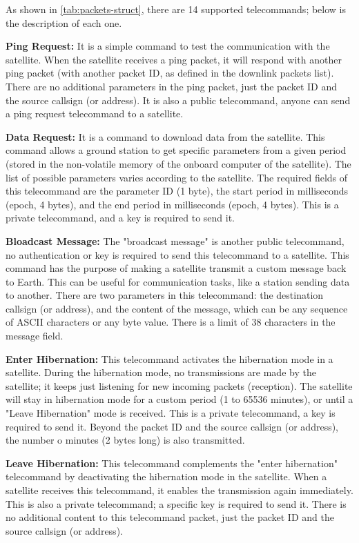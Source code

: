 \par As shown in \autoref{tab:packets-struct}, there are 14 supported telecommands; below is the description of each one.

\textbf{Ping Request:} It is a simple command to test the communication with the satellite. When the satellite receives a ping packet, it will respond with another ping packet (with another packet ID, as defined in the downlink packets list). There are no additional parameters in the ping packet, just the packet ID and the source callsign (or address). It is also a public telecommand, anyone can send a ping request telecommand to a satellite.

\textbf{Data Request:} It is a command to download data from the satellite. This command allows a ground station to get specific parameters from a given period (stored in the non-volatile memory of the onboard computer of the satellite). The list of possible parameters varies according to the satellite. The required fields of this telecommand are the parameter ID (1 byte), the start period in milliseconds (epoch, 4 bytes), and the end period in milliseconds (epoch, 4 bytes). This is a private telecommand, and a key is required to send it.

\textbf{Bloadcast Message: } The "broadcast message" is another public telecommand, no authentication or key is required to send this telecommand to a satellite. This command has the purpose of making a satellite transmit a custom message back to Earth. This can be useful for communication tasks, like a station sending data to another. There are two parameters in this telecommand: the destination callsign (or address), and the content of the message, which can be any sequence of ASCII characters or any byte value. There is a limit of 38 characters in the message field.

\textbf{Enter Hibernation:} This telecommand activates the hibernation mode in a satellite. During the hibernation mode, no transmissions are made by the satellite; it keeps just listening for new incoming packets (reception). The satellite will stay in hibernation mode for a custom period (1 to 65536 minutes), or until a "Leave Hibernation" mode is received. This is a private telecommand, a key is required to send it. Beyond the packet ID and the source callsign (or address), the number o minutes (2 bytes long) is also transmitted.

\textbf{Leave Hibernation:} This telecommand complements the "enter hibernation" telecommand by deactivating the hibernation mode in the satellite. When a satellite receives this telecommand, it enables the transmission again immediately. This is also a private telecommand; a specific key is required to send it. There is no additional content to this telecommand packet, just the packet ID and the source callsign (or address).

